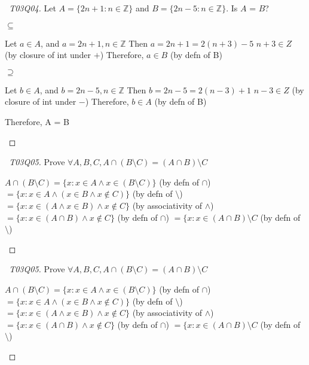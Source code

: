 \documentclass[a4paper]{article}
\theoremstyle{definition}
\begin{document}
\begin{proof}[\proofname\ T03Q04] Let $A = \{2n+1: n \in \mathbb{Z}\}$ and $B = \{2n-5: n \in \mathbb{Z}\}$. Is $A$ = $B$?
  \begin{numpf*}
    \pfln $\subseteq$
    \begin{subpf}
      \pfln Let $a \in A$, and $a = 2n + 1, n \in \mathbb{Z}$
      \pfln Then $a = 2n + 1 = 2 (n+3) - 5$ 
      \pfln $n + 3 \in Z$ (by closure of int under $+$)
      \pfln Therefore, $a \in B$ (by defn of B)
    \end{subpf}
    \pfln $\supseteq$
    \begin{subpf}
      \pfln Let $b \in A$, and $b = 2n - 5, n \in \mathbb{Z}$
      \pfln Then $b = 2n - 5 = 2 (n-3) + 1$ 
      \pfln $n - 3 \in Z$ (by closure of int under $-$)
      \pfln Therefore, $b \in A$ (by defn of B)
    \end{subpf}
    \pfln Therefore, A = B
  \end{numpf*}
\end{proof}
\begin{proof}[\proofname\ T03Q05] Prove $\forall A, B, C, A \cap (B \setminus C) = (A \cap B) \setminus C$
  \begin{numpf*}
    \pfln $A \cap (B \setminus C) = \{x: x \in A \land x \in (B \setminus C) \}$ (by defn of $\cap$)
    \pfln $ = \{x: x \in A \land (x \in B \land x \not \in C) \}$ (by defn of $\setminus$)
    \pfln $ = \{x: x \in (A \land x \in B) \land x \not \in C \}$ (by associativity of $\land$)
    \pfln $ = \{x: x \in (A \cap  B) \land x \not \in C \}$ (by defn of $\cap$)
    \pfln $ = \{x: x \in (A \cap  B) \setminus C$ (by defn of $\setminus$)
  \end{numpf*}
\end{proof}
\begin{proof}[\proofname\ T03Q05] Prove $\forall A, B, C, A \cap (B \setminus C) = (A \cap B) \setminus C$
  \begin{numpf*}
    \pfln $A \cap (B \setminus C) = \{x: x \in A \land x \in (B \setminus C) \}$ (by defn of $\cap$)
    \pfln $ = \{x: x \in A \land (x \in B \land x \not \in C) \}$ (by defn of $\setminus$)
    \pfln $ = \{x: x \in (A \land x \in B) \land x \not \in C \}$ (by associativity of $\land$)
    \pfln $ = \{x: x \in (A \cap  B) \land x \not \in C \}$ (by defn of $\cap$)
    \pfln $ = \{x: x \in (A \cap  B) \setminus C$ (by defn of $\setminus$)
  \end{numpf*}
\end{proof}
\end{document}
